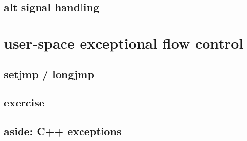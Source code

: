 

\subsection{alt signal handling}



\section{user-space exceptional flow control}
\subsection{setjmp / longjmp}



\subsection{exercise}


\subsection{aside: C++ exceptions}



